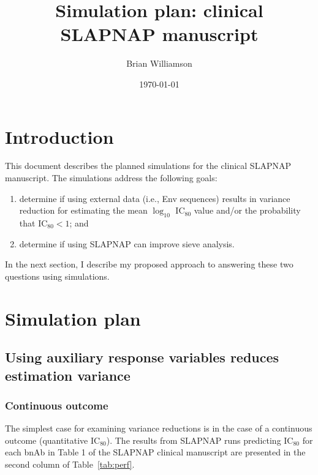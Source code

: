 \documentclass[10pt]{article}
\author{Brian Williamson}
\title{Simulation plan: clinical SLAPNAP manuscript}
\date{\today}
\begin{document}
\maketitle

\section{Introduction}

This document describes the planned simulations for the clinical SLAPNAP manuscript. The simulations address the following goals:
\begin{enumerate}
    \item determine if using external data (i.e., Env sequences) results in variance reduction for estimating the mean $\log_{10}$ IC$_{80}$ value and/or the probability that IC$_{80} < 1$; and
    \item determine if using SLAPNAP can improve sieve analysis.
\end{enumerate}
In the next section, I describe my proposed approach to answering these two questions using simulations.

\section{Simulation plan}
\subsection{Using auxiliary response variables reduces estimation variance}
\subsubsection{Continuous outcome}
The simplest case for examining variance reductions is in the case of a continuous outcome (quantitative IC$_{80}$). The results from SLAPNAP runs predicting IC$_{80}$ for each bnAb in Table 1 of the SLAPNAP clinical manuscript are presented in the second column of Table~\ref{tab:perf}.
\end{document}
